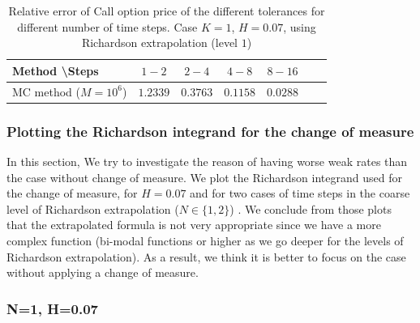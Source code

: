 \documentclass[11pt]{article}
\begin{document}
\begin{table}[h!]
	\centering
	\begin{tabular}{l*{5}{c}r}
		Method \textbackslash  Steps &$1-2$             & $2-4$ & $4-8$ & $8-16$ \\
		\hline	
		MC method ($M=10^{6}$)  &$\mathbf{1.2339}$  & $\mathbf{0.3763}$  & $\mathbf{0.1158}$  & $\mathbf{0.0288}$ \\
		\hline	
		
	\end{tabular}
	\caption{Relative error of Call option price of the different tolerances for different number of time steps. Case $K=1$, $H=0.07$, using Richardson extrapolation (level $1$)}
	\label{Relative error of Call option price of the different tolerances for different number of time steps. Case $K=1, H=0.07$ , using Richardson extrapolation_change_measure}
\end{table}




\subsubsection{Plotting the Richardson integrand for the change of measure}\label{sec:Plotting the Richardson integrand for the change of measure}
In this section, We try to investigate the reason of having worse weak rates than the case without change of measure. We plot the Richardson integrand used for the change of measure, for $H=0.07$ and for  two cases of time steps in the coarse level of Richardson extrapolation ($N \in \{1,2\}$) . We conclude from those plots  that  the extrapolated formula is not very appropriate since we have a more complex function (bi-modal functions or higher as we go deeper for the levels of Richardson extrapolation). As a result, we think it is better to focus on the case without applying a change of measure.


\subsubsection*{N=1, H=0.07}
\end{document}
